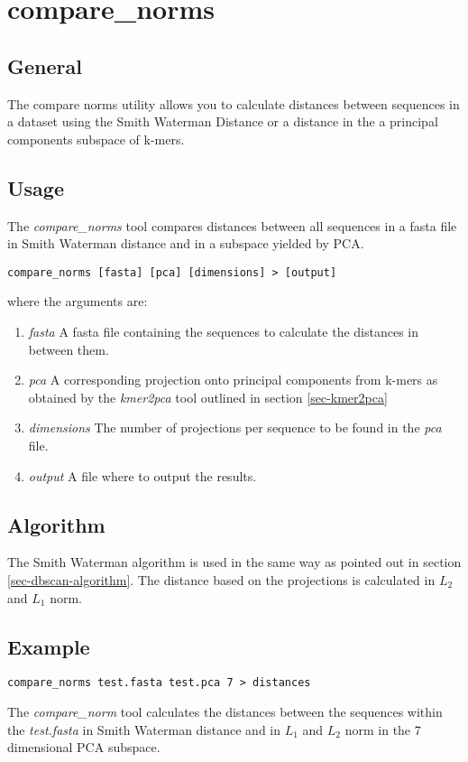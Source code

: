 \section{compare\_norms}

\subsection{General}

The compare norms utility allows you to calculate distances between sequences
in a dataset using the Smith Waterman Distance or a distance in the a
principal components subspace of k-mers.

\subsection{Usage}

The \emph{compare\_norms} tool compares distances between all
sequences in a fasta file in Smith Waterman distance and in a subspace
yielded by PCA. 

\begin{lstlisting}
compare_norms [fasta] [pca] [dimensions] > [output]
\end{lstlisting}
where the arguments are:
\begin{enumerate}
  \item \emph{fasta} A fasta file containing the sequences to
    calculate the distances in between them.
  \item \emph{pca} A corresponding projection onto principal
    components from k-mers as obtained by the \emph{kmer2pca} tool
    outlined in section \ref{sec-kmer2pca}
  \item \emph{dimensions} The number of projections per sequence to be
    found in the \emph{pca} file.
  \item \emph{output} A file where to output the results.
\end{enumerate}

\subsection{Algorithm}
The Smith Waterman algorithm is used in the same way as pointed out in
section \ref{sec-dbscan-algorithm}. The distance based on the
projections is calculated in $L_2$ and $L_1$ norm.

\subsection{Example}
\begin{lstlisting}
compare_norms test.fasta test.pca 7 > distances
\end{lstlisting}
The \emph{compare\_norm} tool calculates the distances between the
sequences within the \emph{test.fasta} in Smith Waterman distance and
in $L_1$ and $L_2$ norm in the 7 dimensional PCA subspace.

